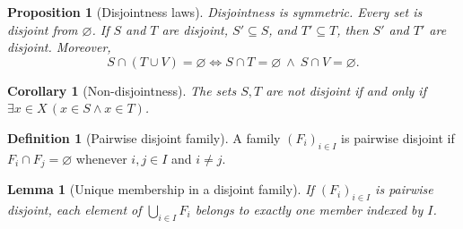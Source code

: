 \documentclass[11pt]{article}
\newtheorem{lemma}[theorem]{Lemma}
\newtheorem{proposition}[theorem]{Proposition}
\newtheorem{corollary}[theorem]{Corollary}
\theoremstyle{definition}
\newtheorem{definition}[theorem]{Definition}
\begin{document}
\begin{proposition}[Disjointness laws]
Disjointness is symmetric. Every set is disjoint from $\varnothing$.
If $S$ and $T$ are disjoint, $S'\subseteq S$, and $T'\subseteq T$,
then $S'$ and $T'$ are disjoint. Moreover,
\[
S\cap(T\cup V)=\varnothing
\iff S\cap T=\varnothing\ \land\ S\cap V=\varnothing.
\]
\end{proposition}
\begin{corollary}[Non-disjointness]
The sets $S,T$ are not disjoint if and only if
$\exists x\in X\,(x\in S\land x\in T)$.
\end{corollary}
\begin{definition}[Pairwise disjoint family]
A family $(F_i)_{i\in I}$ is pairwise disjoint if
$F_i\cap F_j=\varnothing$ whenever $i,j\in I$ and $i\ne j$.
\end{definition}
\begin{lemma}[Unique membership in a disjoint family]
If $(F_i)_{i\in I}$ is pairwise disjoint, each element of
$\bigcup_{i\in I}F_i$ belongs to exactly one member indexed by $I$.
\end{lemma}

\newpage
\end{document}
